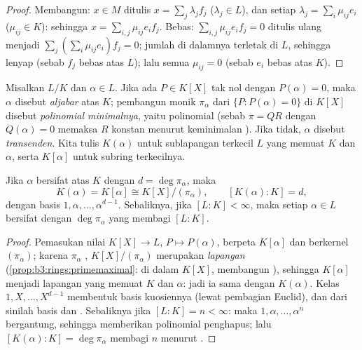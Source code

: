 \begin{proof}
Membangun: $x \in M$ ditulis $x = \sum_j \lambda_jf_j$
($\lambda_j \in L$), dan setiap $\lambda_j = \sum_i \mu_{ij}e_i$
($\mu_{ij} \in K$): sehingga $x = \sum_{i,j}\mu_{ij}e_if_j$. Bebas:
$\sum_{i,j}\mu_{ij}e_if_j = 0$ ditulis ulang menjadi $\sum_j (\sum_i
\mu_{ij}e_i)f_j = 0$; jumlah di dalamnya terletak di $L$, sehingga lenyap
(sebab $f_j$ bebas atas $L$); lalu semua $\mu_{ij} = 0$ (sebab $e_i$
bebas atas $K$).
\end{proof}

\begin{definition}\label{def:b3:galois:algebraic}
Misalkan $L/K$ dan $\alpha \in L$. Jika ada $P \in K[X]$ tak nol dengan
$P(\alpha) = 0$, maka $\alpha$ disebut \emph{aljabar} atas $K$; pembangun monik $\pi_\alpha$ dari 
$\{P : P(\alpha) = 0\}$ di $K[X]$ disebut \emph{polinomial
minimalnya}, yaitu
polinomial  (sebab $\pi = QR$ dengan $Q(\alpha) = 0$ memaksa $R$
konstan menurut keminimalan ). Jika tidak, $\alpha$ disebut
\emph{transenden}. Kita tulis $K(\alpha)$ untuk sublapangan terkecil
$L$ yang memuat $K$ dan $\alpha$, serta $K[\alpha]$ untuk
subring terkecilnya.
\end{definition}

\begin{theorem}\label{thm:b3:galois:simple}
Jika $\alpha$ bersifat  atas $K$ dengan $d = \deg\pi_\alpha$,
maka
\[
K(\alpha) = K[\alpha] \cong K[X]/(\pi_\alpha),
\qquad [K(\alpha) : K] = d,
\]
dengan basis $1, \alpha, \dots, \alpha^{d-1}$. Sebaliknya, jika
$[L:K] < \infty$, maka setiap $\alpha \in L$ bersifat  dengan 
$\deg \pi_\alpha$ yang membagi $[L:K]$.
\end{theorem}

\begin{proof}
Pemasukan nilai $K[X] \to L$, $P \mapsto P(\alpha)$, berpeta
$K[\alpha]$ dan berkernel $(\pi_\alpha)$; karena $\pi_\alpha$
, $K[X]/(\pi_\alpha)$ merupakan \emph{lapangan}
(\cref{prop:b3:rings:primemaximal}: di dalam  $K[X]$,  membangun ), sehingga $K[\alpha]$ menjadi lapangan
yang memuat $K$ dan $\alpha$: jadi ia sama dengan $K(\alpha)$. Kelas
$1, X, \dots, X^{d-1}$ membentuk basis kuosiennya (lewat pembagian
Euclid), dan dari sinilah basis dan . Sebaliknya jika $[L:K]
= n < \infty$: maka $1, \alpha, \dots, \alpha^n$ bergantung, sehingga memberikan
polinomial penghapus; lalu $[K(\alpha):K] =
\deg\pi_\alpha$ membagi $n$ menurut .
\end{proof}

